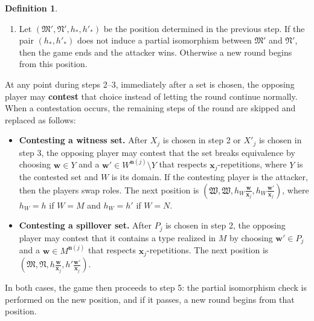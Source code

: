 \documentclass{article}
\theoremstyle{definition}
\newtheorem{definition}[theorem]{Definition}
\begin{document}
\begin{definition}
\begin{enumerate}
\begin{enumerate}
            \begin{itemize}
                \item chooses $\mathbf{w}\in X_j$, after which the next             position is $(\mathfrak{M},\mathfrak{N},             h\frac{\mathbf{w}}{\mathbf{x}_j},             h'\frac{\mathbf{w}'}{\mathbf{x}_j})$, or
                \item chooses $\mathbf{w}\in P_j$, after which the next             position is $(\mathfrak{N},\mathfrak{N},             \frac{\mathbf{w}}{\mathbf{x}_j},             \frac{\mathbf{w}'}{\mathbf{x}_j})$.
            \end{itemize}
        \end{enumerate}
        \item Let $(\mathfrak{M}',\mathfrak{N}',h_*,h'_*)$ be the position     determined in the previous step. If the pair $(h_*,h'_*)$ does not     induce a partial isomorphism between $\mathfrak{M}'$ and     $\mathfrak{N}'$, then the game ends and the attacker wins. Otherwise     a new round begins from this position.
    \end{enumerate}
    At any point during steps 2--3, immediately after a set is chosen, the opposing player may \textbf{contest} that choice instead of letting the round continue normally. When a contestation occurs, the remaining steps of the round are skipped and replaced as follows:
    \begin{itemize}
        \item \textbf{Contesting a witness set.} After $X_j$ is chosen in     step 2 or $X'_j$ is chosen in step 3, the opposing player may     contest that the set breaks equivalence by choosing $\mathbf{w}\in Y$ and     a $\mathbf{w}'\in W^{\mathbf{n}(j)}\setminus Y$ that respects $\textbf{x}_j$-repetitions, where $Y$ is the     contested set and $W$ is its domain. If the contesting player is the     attacker, then the players swap roles. The next position is     $(\mathfrak{W},\mathfrak{W},     h_W\frac{\mathbf{w}}{\mathbf{x}_j},     h_W\frac{\mathbf{w}'}{\mathbf{x}_j})$, where $h_W=h$ if $W=M$     and $h_W=h'$ if $W=N$.
        \item \textbf{Contesting a spillover set.} After $P_j$ is chosen in     step 2, the opposing player may contest that it contains a type     realized in $M$ by choosing $\mathbf{w}'\in P_j$ and     a $\mathbf{w}\in M^{\mathbf{n}(j)}$ that respects $\textbf{x}_j$-repetitions. The next position is     $(\mathfrak{M},\mathfrak{N},     h\frac{\mathbf{w}}{\mathbf{x}_j},     h'\frac{\mathbf{w}'}{\mathbf{x}_j})$.
    \end{itemize}
    In both cases, the game then proceeds to step 5: the partial isomorphism check is performed on the new position, and if it passes, a new round begins from that position.
\end{definition}
\end{document}
